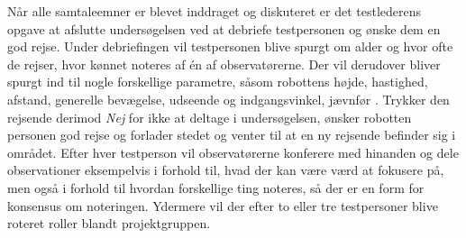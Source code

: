 Når alle samtaleemner er blevet inddraget og diskuteret er det testlederens opgave at afslutte undersøgelsen ved at debriefe testpersonen og ønske dem en god rejse. Under debriefingen vil testpersonen blive spurgt om alder og hvor ofte de rejser, hvor kønnet noteres af én af observatørerne. Der vil derudover bliver spurgt ind til nogle forskellige parametre, såsom robottens højde, hastighed, afstand, generelle bevægelse, udseende og indgangsvinkel, jævnfør .\blankline      
%
Trykker den rejsende derimod \textit{Nej} for ikke at deltage i undersøgelsen, ønsker robotten personen god rejse og forlader stedet og venter til at en ny rejsende befinder sig i området.\blankline
%
Efter hver testperson vil observatørerne konferere med hinanden og dele observationer eksempelvis i forhold til, hvad der kan være værd at fokusere på, men også i forhold til hvordan forskellige ting noteres, så der er en form for konsensus om noteringen. Ydermere vil der efter to eller tre testpersoner blive roteret roller blandt projektgruppen.  


